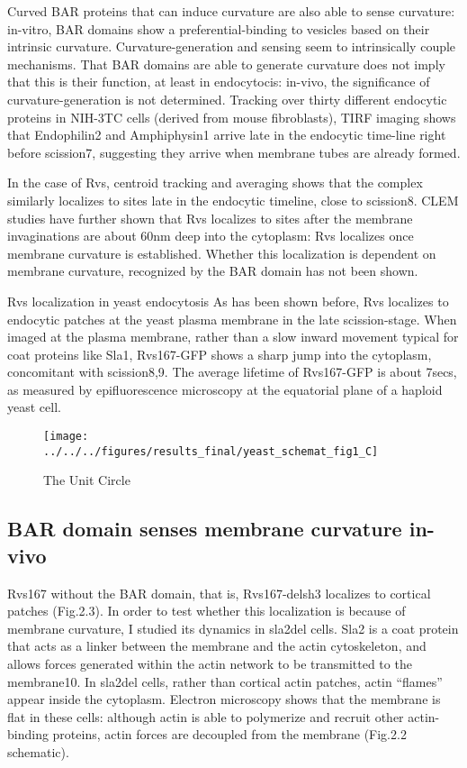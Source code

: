 \vspace{5mm}
Curved BAR proteins that can induce curvature are also able to sense curvature: in-vitro, BAR domains show a preferential-binding to vesicles based on their intrinsic curvature. Curvature-generation and sensing seem to intrinsically couple mechanisms. That BAR domains are able to generate curvature does not imply that this is their function, at least in endocytocis: in-vivo, the significance of curvature-generation is not determined. Tracking over thirty different endocytic proteins in NIH-3TC cells (derived from mouse fibroblasts), TIRF imaging shows that Endophilin2 and Amphiphysin1 arrive late in the endocytic time-line right before scission7, suggesting they arrive when membrane tubes are already formed. 

\vspace{5mm}
In the case of Rvs, centroid tracking and averaging shows that the complex similarly localizes to sites late in the endocytic timeline, close to scission8. CLEM studies have further shown that Rvs localizes to sites after the membrane invaginations are about 60nm deep into the cytoplasm: Rvs localizes once membrane curvature is established. Whether this localization is dependent on membrane curvature, recognized by the BAR domain has not been shown. 

\vspace{5mm}
Rvs localization in yeast endocytosis
As has been shown before, Rvs localizes to endocytic patches at the yeast plasma membrane in the late scission-stage. When imaged at the plasma membrane, rather than a slow inward movement typical for coat proteins like Sla1, Rvs167-GFP shows a sharp jump into the cytoplasm, concomitant with scission8,9. The average lifetime of Rvs167-GFP is about 7secs, as measured by epifluorescence microscopy at the equatorial plane of a haploid yeast cell. 

\begin{figure}
\centering
\texttt{[image: ../../../figures/results\_final/yeast\_schemat\_fig1\_C]}
\caption{The Unit Circle \label{fig1_schematic}}
\end{figure}

	\subsection{BAR domain senses membrane curvature in-vivo}
	Rvs167 without the BAR domain, that is, Rvs167-delsh3 localizes to cortical patches (Fig.2.3). In order to test whether this localization is because of membrane curvature, I studied its dynamics in sla2del cells. Sla2 is a coat protein that acts as a linker between the membrane and the actin cytoskeleton, and allows forces generated within the actin network to be transmitted to the membrane10. In sla2del cells, rather than cortical actin patches, actin “flames” appear inside the cytoplasm. Electron microscopy shows that the membrane is flat in these cells: although actin is able to polymerize and recruit other actin-binding proteins, actin forces are decoupled from the membrane (Fig.2.2 schematic). 
	
